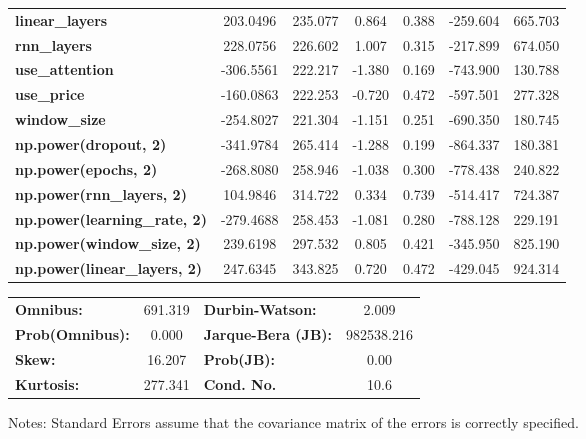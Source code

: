 \begin{center}
\begin{tabular}{lcccccc}
\textbf{linear\_layers}              &     203.0496  &      235.077     &     0.864  &         0.388        &     -259.604    &      665.703     \\
\textbf{rnn\_layers}                 &     228.0756  &      226.602     &     1.007  &         0.315        &     -217.899    &      674.050     \\
\textbf{use\_attention}              &    -306.5561  &      222.217     &    -1.380  &         0.169        &     -743.900    &      130.788     \\
\textbf{use\_price}                  &    -160.0863  &      222.253     &    -0.720  &         0.472        &     -597.501    &      277.328     \\
\textbf{window\_size}                &    -254.8027  &      221.304     &    -1.151  &         0.251        &     -690.350    &      180.745     \\
\textbf{np.power(dropout, 2)}        &    -341.9784  &      265.414     &    -1.288  &         0.199        &     -864.337    &      180.381     \\
\textbf{np.power(epochs, 2)}         &    -268.8080  &      258.946     &    -1.038  &         0.300        &     -778.438    &      240.822     \\
\textbf{np.power(rnn\_layers, 2)}    &     104.9846  &      314.722     &     0.334  &         0.739        &     -514.417    &      724.387     \\
\textbf{np.power(learning\_rate, 2)} &    -279.4688  &      258.453     &    -1.081  &         0.280        &     -788.128    &      229.191     \\
\textbf{np.power(window\_size, 2)}   &     239.6198  &      297.532     &     0.805  &         0.421        &     -345.950    &      825.190     \\
\textbf{np.power(linear\_layers, 2)} &     247.6345  &      343.825     &     0.720  &         0.472        &     -429.045    &      924.314     \\
\bottomrule
\end{tabular}
\begin{tabular}{lclc}
\textbf{Omnibus:}       & 691.319 & \textbf{  Durbin-Watson:     } &     2.009   \\
\textbf{Prob(Omnibus):} &   0.000 & \textbf{  Jarque-Bera (JB):  } & 982538.216  \\
\textbf{Skew:}          &  16.207 & \textbf{  Prob(JB):          } &      0.00   \\
\textbf{Kurtosis:}      & 277.341 & \textbf{  Cond. No.          } &      10.6   \\
\bottomrule
\end{tabular}
\end{center}

Notes: \newline
 [1] Standard Errors assume that the covariance matrix of the errors is correctly specified.